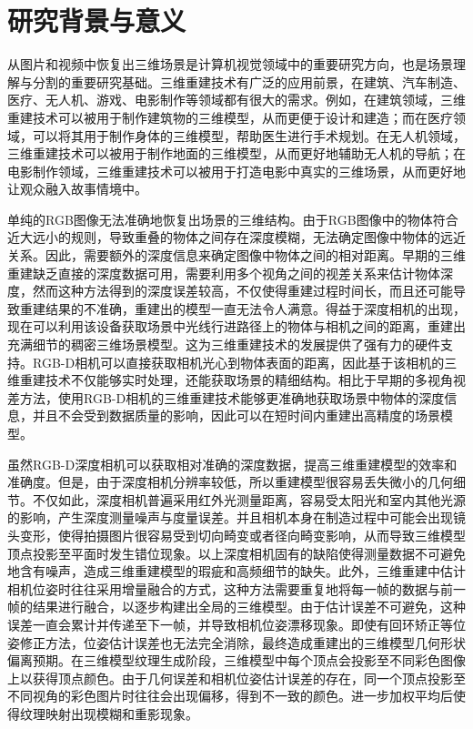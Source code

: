 \section{研究背景与意义}
从图片和视频中恢复出三维场景是计算机视觉领域中的重要研究方向，也是场景理解与分割的重要研究基础。三维重建技术有广泛的应用前景，在建筑、汽车制造、医疗、无人机、游戏、电影制作等领域都有很大的需求。例如，在建筑领域，三维重建技术可以被用于制作建筑物的三维模型，从而更便于设计和建造；而在医疗领域，可以将其用于制作身体的三维模型，帮助医生进行手术规划。在无人机领域，三维重建技术可以被用于制作地面的三维模型，从而更好地辅助无人机的导航；在电影制作领域，三维重建技术可以被用于打造电影中真实的三维场景，从而更好地让观众融入故事情境中。\par
单纯的RGB图像无法准确地恢复出场景的三维结构。由于RGB图像中的物体符合近大远小的规则，导致重叠的物体之间存在深度模糊，无法确定图像中物体的远近关系。因此，需要额外的深度信息来确定图像中物体之间的相对距离。早期的三维重建缺乏直接的深度数据可用，需要利用多个视角之间的视差关系来估计物体深度，然而这种方法得到的深度误差较高，不仅使得重建过程时间长，而且还可能导致重建结果的不准确，重建出的模型一直无法令人满意。得益于深度相机的出现，现在可以利用该设备获取场景中光线行进路径上的物体与相机之间的距离，重建出充满细节的稠密三维场景模型。这为三维重建技术的发展提供了强有力的硬件支持。RGB-D相机可以直接获取相机光心到物体表面的距离，因此基于该相机的三维重建技术不仅能够实时处理，还能获取场景的精细结构。相比于早期的多视角视差方法，使用RGB-D相机的三维重建技术能够更准确地获取场景中物体的深度信息，并且不会受到数据质量的影响，因此可以在短时间内重建出高精度的场景模型。\par
虽然RGB-D深度相机可以获取相对准确的深度数据，提高三维重建模型的效率和准确度。但是，由于深度相机分辨率较低，所以重建模型很容易丢失微小的几何细节。不仅如此，深度相机普遍采用红外光测量距离，容易受太阳光和室内其他光源的影响，产生深度测量噪声与度量误差。并且相机本身在制造过程中可能会出现镜头变形，使得拍摄图片很容易受到切向畸变或者径向畸变影响，从而导致三维模型顶点投影至平面时发生错位现象。以上深度相机固有的缺陷使得测量数据不可避免地含有噪声，造成三维重建模型的瑕疵和高频细节的缺失。此外，三维重建中估计相机位姿时往往采用增量融合的方式，这种方法需要重复地将每一帧的数据与前一帧的结果进行融合，以逐步构建出全局的三维模型。由于估计误差不可避免，这种误差一直会累计并传递至下一帧，并导致相机位姿漂移现象。即使有回环矫正等位姿修正方法，位姿估计误差也无法完全消除，最终造成重建出的三维模型几何形状偏离预期。在三维模型纹理生成阶段，三维模型中每个顶点会投影至不同彩色图像上以获得顶点颜色。由于几何误差和相机位姿估计误差的存在，同一个顶点投影至不同视角的彩色图片时往往会出现偏移，得到不一致的颜色。进一步加权平均后使得纹理映射出现模糊和重影现象。\par
